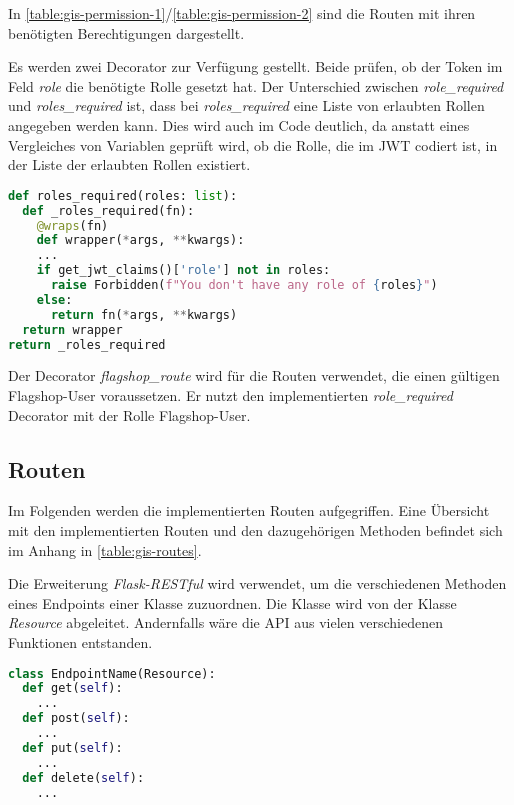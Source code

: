 In \autoref{table:gis-permission-1}/\ref{table:gis-permission-2} sind die Routen mit ihren benötigten Berechtigungen dargestellt.

Es werden zwei Decorator zur Verfügung gestellt. Beide prüfen, ob der Token im Feld \textit{role} die benötigte Rolle gesetzt hat. Der Unterschied zwischen \textit{role\_required} und \textit{roles\_required} ist, dass bei \textit{roles\_required} eine Liste von erlaubten Rollen angegeben werden kann. Dies wird auch im Code deutlich, da anstatt eines Vergleiches von Variablen geprüft wird, ob die Rolle, die im JWT codiert ist, in der Liste der erlaubten Rollen existiert.

\begin{lstlisting}[language=Python, frame=single, caption={GIS Prüfung der Rollen}, captionpos=b, label={lst:gis-permission-wrapper}]
def roles_required(roles: list):
  def _roles_required(fn):
    @wraps(fn)
    def wrapper(*args, **kwargs):
    ...
    if get_jwt_claims()['role'] not in roles:
      raise Forbidden(f"You don't have any role of {roles}")
    else:
      return fn(*args, **kwargs)
  return wrapper
return _roles_required
\end{lstlisting}

Der Decorator \textit{flagshop\_route} wird für die Routen verwendet, die einen gültigen Flagshop-User voraussetzen. Er nutzt den implementierten \textit{role\_required} Decorator mit der Rolle \linebreak Flagshop-User.

\subsection{Routen} \label{sub:realisierung-gis-routen}
Im Folgenden werden die implementierten Routen aufgegriffen. Eine Übersicht mit den implementierten Routen und den dazugehörigen Methoden befindet sich im Anhang in \autoref{table:gis-routes}.

Die Erweiterung \textit{Flask-RESTful} wird verwendet, um die verschiedenen Methoden eines Endpoints einer Klasse zuzuordnen. Die Klasse wird von der Klasse \textit{Resource} abgeleitet. Andernfalls wäre die API aus vielen verschiedenen Funktionen entstanden.

\begin{lstlisting}[language=Python, frame=single, caption={GIS Beispiel eines Endpoints}, captionpos=b, label={lst:gis-endpoint}]
class EndpointName(Resource):
  def get(self):
    ...
  def post(self):
    ...
  def put(self):
    ...
  def delete(self):
    ...
\end{lstlisting}

